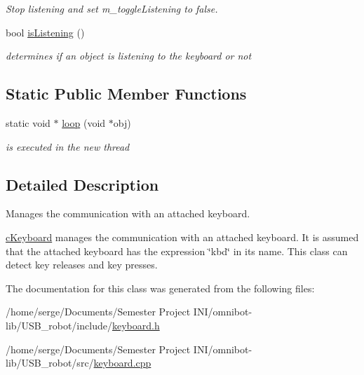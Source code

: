 \begin{DoxyCompactItemize}
\begin{DoxyCompactList}\small\item\em Stop listening and set m\+\_\+toggle\+Listening to false. \end{DoxyCompactList}\item 
\hypertarget{classc_keyboard_afb266be2c1e34f140d2a55f17f288af9}{}bool \hyperlink{classc_keyboard_afb266be2c1e34f140d2a55f17f288af9}{is\+Listening} ()\label{classc_keyboard_afb266be2c1e34f140d2a55f17f288af9}

\begin{DoxyCompactList}\small\item\em determines if an object is listening to the keyboard or not \end{DoxyCompactList}\end{DoxyCompactItemize}
\subsection*{Static Public Member Functions}
\begin{DoxyCompactItemize}
\item 
\hypertarget{classc_keyboard_ae02219e223b4074f844797d3707ed106}{}static void $\ast$ \hyperlink{classc_keyboard_ae02219e223b4074f844797d3707ed106}{loop} (void $\ast$obj)\label{classc_keyboard_ae02219e223b4074f844797d3707ed106}

\begin{DoxyCompactList}\small\item\em is executed in the new thread \end{DoxyCompactList}\end{DoxyCompactItemize}


\subsection{Detailed Description}
Manages the communication with an attached keyboard. 

\hyperlink{classc_keyboard}{c\+Keyboard} manages the communication with an attached keyboard. It is assumed that the attached keyboard has the expression \char`\"{}kbd\char`\"{} in its name. This class can detect key releases and key presses. 

The documentation for this class was generated from the following files\+:\begin{DoxyCompactItemize}
\item 
/home/serge/\+Documents/\+Semester Project I\+N\+I/omnibot-\/lib/\+U\+S\+B\+\_\+robot/include/\hyperlink{keyboard_8h}{keyboard.\+h}\item 
/home/serge/\+Documents/\+Semester Project I\+N\+I/omnibot-\/lib/\+U\+S\+B\+\_\+robot/src/\hyperlink{keyboard_8cpp}{keyboard.\+cpp}\end{DoxyCompactItemize}
